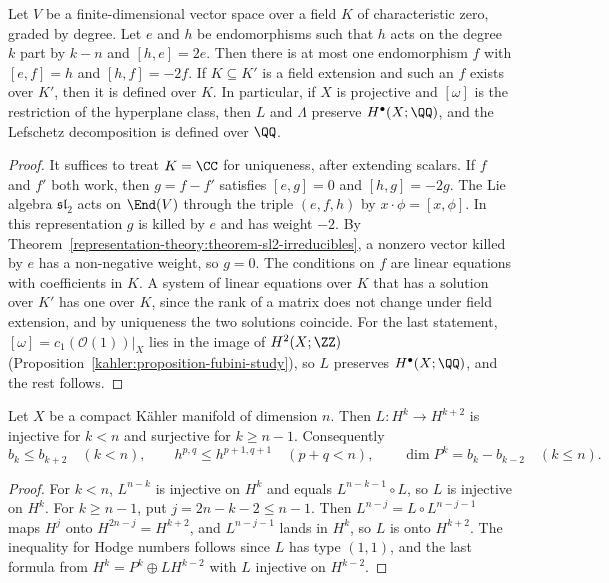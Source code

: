\begin{proposition}\label{kahler:proposition-lambda-unique}
Let $V$ be a finite-dimensional vector space over a field $K$ of characteristic zero, graded by degree. Let $e$ and $h$ be endomorphisms
such that $h$ acts on the degree $k$ part by $k - n$ and $[h, e] = 2e$. Then there is at most one endomorphism $f$ with $[e, f] = h$ and
$[h, f] = -2f$. If $K \subseteq K'$ is a field extension and such an $f$ exists over $K'$, then it is defined over $K$. In particular, if $X$ is
projective and $[\omega]$ is the restriction of the hyperplane class, then $L$ and $\Lambda$ preserve $H^\bullet(X; \QQ)$, and the
Lefschetz decomposition is defined over $\QQ$.
\end{proposition}

\begin{proof}
It suffices to treat $K = \CC$ for uniqueness, after extending scalars. If $f$ and $f'$ both work, then $g = f - f'$ satisfies $[e, g] = 0$ and
$[h, g] = -2g$. The Lie algebra $\mathfrak{sl}_2$ acts on $\End(V)$ through the triple $(e, f, h)$ by $x \cdot \phi = [x, \phi]$. In this
representation $g$ is killed by $e$ and has weight $-2$. By Theorem~\ref{representation-theory:theorem-sl2-irreducibles}, a nonzero vector
killed by $e$ has a non-negative weight, so $g = 0$. The conditions on $f$ are linear equations with coefficients in $K$. A system of linear
equations over $K$ that has a solution over $K'$ has one over $K$, since the rank of a matrix does not change under field extension, and by
uniqueness the two solutions coincide. For the last statement, $[\omega] = c_1(\mathcal{O}(1))|_X$ lies in the image of
$H^2(X; \ZZ)$ (Proposition~\ref{kahler:proposition-fubini-study}), so $L$ preserves $H^\bullet(X; \QQ)$, and the rest follows.
\end{proof}

\begin{corollary}\label{kahler:corollary-betti-inequalities}
Let $X$ be a compact K\"ahler manifold of dimension $n$. Then $L \colon H^k \to H^{k+2}$ is injective for $k < n$ and surjective for
$k \geq n - 1$. Consequently
\[
b_k \leq b_{k+2} \quad (k < n), \qquad h^{p,q} \leq h^{p+1,q+1} \quad (p + q < n), \qquad \dim P^k = b_k - b_{k-2} \quad (k \leq n).
\]
\end{corollary}

\begin{proof}
For $k < n$, $L^{n-k}$ is injective on $H^k$ and equals $L^{n-k-1} \circ L$, so $L$ is injective on $H^k$. For $k \geq n - 1$, put
$j = 2n - k - 2 \leq n - 1$. Then $L^{n-j} = L \circ L^{n-j-1}$ maps $H^j$ onto $H^{2n-j} = H^{k+2}$, and $L^{n-j-1}$ lands in $H^k$, so $L$ is
onto $H^{k+2}$. The inequality for Hodge numbers follows since $L$ has type $(1,1)$, and the last formula from
$H^k = P^k \oplus LH^{k-2}$ with $L$ injective on $H^{k-2}$.
\end{proof}

